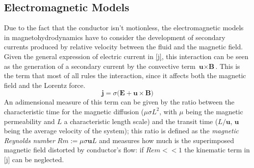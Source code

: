 \subsection{Electromagnetic Models}
Due to the fact that the conductor isn't motionless, the electromagnetic models in magnetohydrodynamics have to consider the development of secondary currents produced by relative velocity between the fluid and the magnetic field. Given the general expression of electric current in \eqref{j}, this interaction can be seen as the generation of a secondary current by the convective term $\textbf{u} \times \textbf{B}$. This is the term that most of all rules the interaction, since it affects both the magnetic field and the Lorentz force.
\begin{equation}
\textbf{j}=\sigma (\textbf{E}+\textbf{u} \times \textbf{B)}
\label{j}
\end{equation}
 An adimensional measure of this term can be given by the ratio between the characteristic time for the magnetic diffusion ($\mu \sigma L^2$, with $\mu $ being the magnetic permeability and $L$ a characteristic length scale) and the transit time ($L/\textbf{u}$, $\textbf{u}$ being the average velocity of the system); this ratio is defined as the \textit{magnetic Reynolds number} $Rm:=\mu \sigma \textbf{u} L$ and measures how much is the superimposed magnetic field distorted by conductor's flow: if $Rem<<1$ the kinematic term in \eqref{j} can be neglected.
